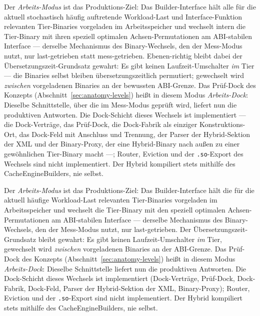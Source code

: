 \begin{nurlang}
Der \emph{Arbeits-Modus} ist das Produktions-Ziel: Das Builder-Interface hält alle für die aktuell
stochastisch häufig auftretende Workload-Last und Interface-Funktion relevanten Tier-Binaries vorgeladen im
Arbeitsspeicher und wechselt intern die Tier-Binary mit ihren speziell optimalen
Achsen-Permutationen am ABI-stabilen Interface --- derselbe Mechanismus des Binary-Wechsels, den der
Mess-Modus nutzt, nur last-getrieben statt mess-getrieben. Ebenen-richtig bleibt dabei der
Übersetzungszeit-Grundsatz gewahrt: Es gibt keinen Laufzeit-Umschalter \emph{im} Tier --- die Binaries
selbst bleiben übersetzungszeitlich permutiert; gewechselt wird \emph{zwischen} vorgeladenen Binaries an
der bewussten ABI-Grenze. Das Prüf-Dock des Konzepts (Abschnitt~\ref{sec:anatomy-levels}) heißt in diesem
Modus \emph{Arbeits-Dock}: Dieselbe Schnittstelle, über die im Mess-Modus geprüft wird, liefert nun die
produktiven Antworten. Die Dock-Schicht dieses Wechsels ist implementiert --- die Dock-Verträge, das Prüf-Dock,
die Dock-Fabrik als einziger Konstruktions-Ort, das Dock-Feld mit Anschluss und Trennung, der Parser
der Hybrid-Sektion der XML und der Binary-Proxy, der eine Hybrid-Binary nach außen zu einer gewöhnlichen
Tier-Binary macht ---; Router, Eviction und der \texttt{.so}-Export des Wechsels sind nicht implementiert.
Der Hybrid kompiliert stets mithilfe des CacheEngineBuilders, nie selbst.
\end{nurlang}
\begin{nurkurz}
Der \emph{Arbeits-Modus} ist das Produktions-Ziel: Das Builder-Interface hält die für die aktuell häufige
Workload-Last relevanten Tier-Binaries vorgeladen im Arbeitsspeicher und wechselt die Tier-Binary mit den
speziell optimalen Achsen-Permutationen am ABI-stabilen Interface --- derselbe Mechanismus des Binary-Wechsels,
den der Mess-Modus nutzt, nur last-getrieben. Der Übersetzungszeit-Grundsatz bleibt gewahrt: Es gibt keinen
Laufzeit-Umschalter \emph{im} Tier, gewechselt wird \emph{zwischen} vorgeladenen Binaries an der ABI-Grenze. Das
Prüf-Dock des Konzepts (Abschnitt~\ref{sec:anatomy-levels}) heißt in diesem Modus \emph{Arbeits-Dock}: Dieselbe
Schnittstelle liefert nun die produktiven Antworten. Die Dock-Schicht dieses Wechsels ist implementiert
(Dock-Verträge, Prüf-Dock, Dock-Fabrik, Dock-Feld, Parser der Hybrid-Sektion der XML, Binary-Proxy); Router,
Eviction und der \texttt{.so}-Export sind nicht implementiert. Der Hybrid kompiliert stets mithilfe des
CacheEngineBuilders, nie selbst.
\end{nurkurz}

